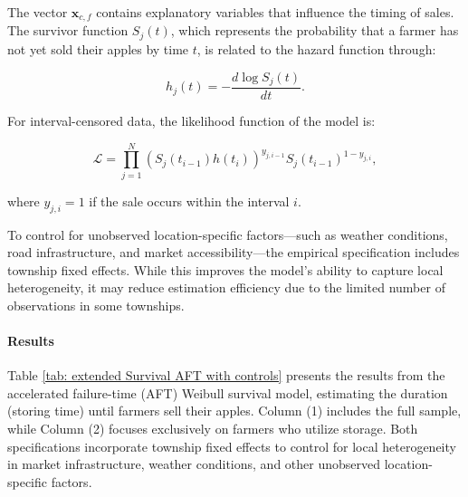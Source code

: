 \documentclass[12pt]{article}
\begin{document}
The vector $\mathbf{x}_{c,f}$ contains explanatory variables that influence the timing of sales. The survivor function $S_j(t)$, which represents the probability that a farmer has not yet sold their apples by time $t$, is related to the hazard function through:  

\begin{equation}
    h_j(t) = -\frac{d \log S_j(t)}{dt}.
\end{equation}

For interval-censored data, the likelihood function of the model is:  

\begin{equation}
    \mathcal{L} = \prod_{j=1}^N \left(S_j(t_{i-1}) h(t_i)\right)^{y_{j,i-1}} S_j(t_{i-1})^{1-y_{j,i}},
\end{equation}

where $y_{j,i} = 1$ if the sale occurs within the interval $i$.  

To control for unobserved location-specific factors—such as weather conditions, road infrastructure, and market accessibility—the empirical specification includes township fixed effects. While this improves the model’s ability to capture local heterogeneity, it may reduce estimation efficiency due to the limited number of observations in some townships.



\paragraph{Results}
Table \ref{tab: extended Survival AFT with controls} presents the results from the accelerated failure-time (AFT) Weibull survival model, estimating the duration (storing time) until farmers sell their apples. Column (1) includes the full sample, while Column (2) focuses exclusively on farmers who utilize storage. Both specifications incorporate township fixed effects to control for local heterogeneity in market infrastructure, weather conditions, and other unobserved location-specific factors.  
\end{document}
